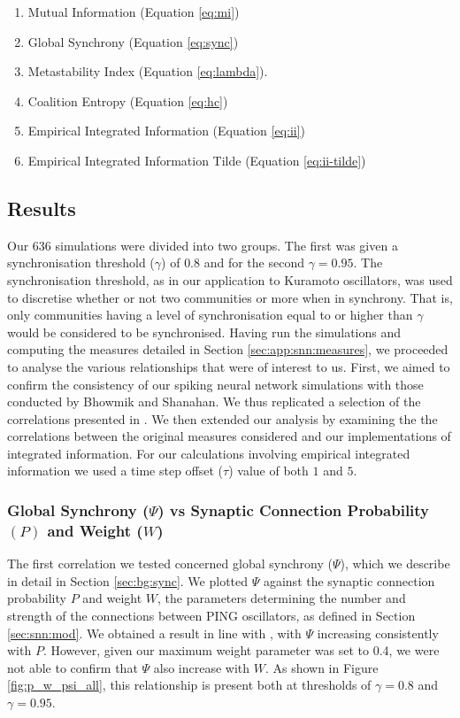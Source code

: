 \documentclass[a4paper,11pt]{article}
\begin{document}
\begin{enumerate}
\item{Mutual Information (Equation \ref{eq:mi})}
\item{Global Synchrony (Equation \ref{eq:sync})}
\item{Metastability Index (Equation \ref{eq:lambda})}.
\item{Coalition Entropy (Equation \ref{eq:hc})}
\item{Empirical Integrated Information (Equation \ref{eq:ii})}
\item{Empirical Integrated Information Tilde (Equation \ref{eq:ii-tilde})}
\end{enumerate}

\subsection{Results}
\label{sec:snn:res}

Our 636 simulations were divided into two groups. The first was given a synchronisation threshold ($\gamma$) of $0.8$ and for the second $\gamma = 0.95$. The synchronisation threshold, as in our application to Kuramoto oscillators, was used to discretise whether or not two communities or more when in synchrony. That is, only communities having a level of synchronisation equal to or higher than $\gamma$ would be considered to be synchronised. Having run the simulations and computing the measures detailed in Section \ref{sec:app:snn:measures}, we proceeded to analyse the various relationships that were of interest to us. First, we aimed to confirm the consistency of our spiking neural network simulations with those conducted by Bhowmik and Shanahan. We thus replicated a selection of the correlations presented in \cite{Bhowmik2013}. We then extended our analysis by examining the the correlations between the original measures considered and our implementations of integrated information. For our calculations involving empirical integrated information we used a time step offset ($\tau$) value of both $1$ and $5$.

\subsubsection{Global Synchrony ($\Psi$) vs Synaptic Connection Probability $(P)$ and Weight ($W$)}
\label{sec:app:snn:res:sync}
The first correlation we tested concerned global synchrony ($\Psi$), which we describe in detail in Section \ref{sec:bg:sync}. We plotted $\Psi$ against the synaptic connection probability $P$ and weight $W$, the parameters determining the number and strength of the connections between PING oscillators, as defined in Section \ref{sec:snn:mod}. We obtained a result in line with \cite{Bhowmik2013}, with $\Psi$ increasing consistently with $P$. However, given our maximum weight parameter was set to 0.4, we were not able to confirm that $\Psi$ also increase with $W$. As shown in Figure \ref{fig:p_w_psi_all}, this relationship is present both at thresholds of $\gamma = 0.8$ and $\gamma = 0.95$.
\end{document}
